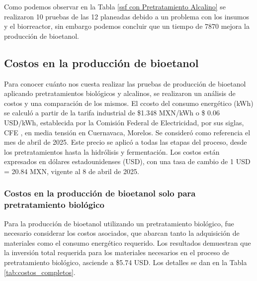 \documentclass[12pt]{article}
\begin{document}
		
 Como podemos observar en la Tabla \ref{ssf con Pretratamiento Alcalino} se realizaron 10 pruebas de las 12 planeadas debido a un problema con los insumos y el biorreactor, sin embargo podemos concluir que un tiempo de 7870 mejora la producción de bioetanol.
				
		
		
		
		
			
			\subsection{Costos en la producción de bioetanol}
	Para conocer cuánto nos cuesta realizar las pruebas de producción de bioetanol aplicando pretratamientos biológicos y alcalinos, se realizaron un análisis de costos y una comparación de los mismos.
	El ccosto del consumo energético (kWh) se calculó a partir de la tarifa industrial de \$1.348 MXN/kWh o \$ 0.06 USD/kWh, establecida por la Comisión Federal de Electricidad, por sus siglas, CFE  \cite{CFE2023}, en media tensión en Cuernavaca, Morelos. Se consideró como referencia el mes de abril de 2025. Este precio se aplicó a todas las etapas del proceso, desde los pretratamientos hasta la hidrólisis y fermentación. Los costos están expresados en dólares estadounidenses (USD), con una tasa de cambio de 1 USD = 20.84 MXN, vigente al 8 de abril de 2025.
			
		
	 \subsubsection{Costos en la producción de bioetanol solo para pretratamiento biológico}
			
			
Para la producción de bioetanol utilizando un pretratamiento biológico, fue necesario considerar los costos asociados, que abarcan tanto la adquisición de materiales como el consumo energético requerido. Los resultados demuestran que la inversión total requerida para los materiales necesarios en el proceso de pretratamiento biológico, asciende a \$5.74 USD. Los detalles se dan en  la Tabla 	\ref{tab:costos_completos}.
\end{document}
